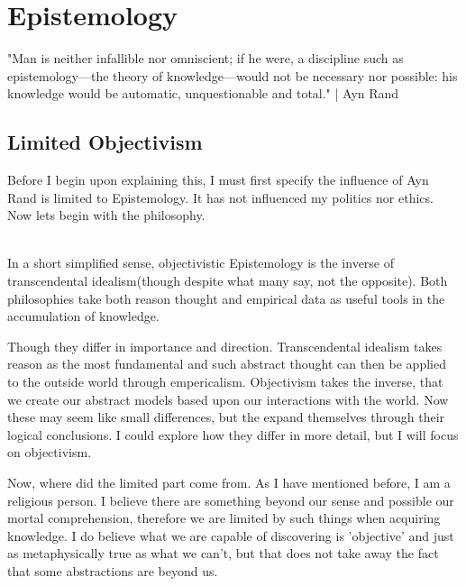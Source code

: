\chapter{Epistemology}

"Man is neither infallible nor omniscient; if he were, a discipline such as epistemology—the theory of knowledge—would not be necessary nor possible: his knowledge would be automatic, unquestionable and total." | Ayn Rand
\section{Limited Objectivism}
\par Before I begin upon explaining this, I must first specify the influence of Ayn Rand is limited to Epistemology. It has not influenced my politics nor ethics. Now lets begin with the philosophy.
\\
\\
\par In a short simplified sense, objectivistic Epistemology is the inverse of transcendental idealism(though despite what many say, not the opposite). Both philosophies take both reason thought and empirical data as useful tools in the accumulation of knowledge.
\par Though they differ in importance and direction. Transcendental idealism takes reason as the most fundamental and such abstract thought can then be applied to the outside world through empericalism. Objectivism takes the inverse, that we create our abstract models based upon our interactions with the world. Now these may seem like small differences, but the expand themselves through their logical conclusions. I could explore how they differ in more detail, but I will focus on objectivism.

\par Now, where did the limited part come from. As I have mentioned before, I am a religious person. I believe there are something beyond our sense and possible our mortal comprehension, therefore we are limited by such things when acquiring knowledge. I do believe what we are capable of discovering is 'objective' and just as metaphysically true as what we can't, but that does not take away the fact that some abstractions are beyond us.
